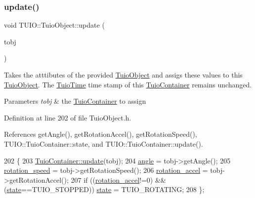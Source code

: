 \subsubsection{\texorpdfstring{update()}{update()}\hspace{0.1cm}{\footnotesize\ttfamily [4/4]}}
{\footnotesize\ttfamily void T\+U\+I\+O\+::\+Tuio\+Object\+::update (\begin{DoxyParamCaption}\item[{\hyperlink{class_t_u_i_o_1_1_tuio_object}{Tuio\+Object} $\ast$}]{tobj }\end{DoxyParamCaption})\hspace{0.3cm}{\ttfamily [inline]}}

Takes the atttibutes of the provided \hyperlink{class_t_u_i_o_1_1_tuio_object}{Tuio\+Object} and assigs these values to this \hyperlink{class_t_u_i_o_1_1_tuio_object}{Tuio\+Object}. The \hyperlink{class_t_u_i_o_1_1_tuio_time}{Tuio\+Time} time stamp of this \hyperlink{class_t_u_i_o_1_1_tuio_container}{Tuio\+Container} remains unchanged.


\begin{DoxyParams}{Parameters}
{\em tobj} & the \hyperlink{class_t_u_i_o_1_1_tuio_container}{Tuio\+Container} to assign \\
\hline
\end{DoxyParams}


Definition at line 202 of file Tuio\+Object.\+h.



References get\+Angle(), get\+Rotation\+Accel(), get\+Rotation\+Speed(), T\+U\+I\+O\+::\+Tuio\+Container\+::state, and T\+U\+I\+O\+::\+Tuio\+Container\+::update().


\begin{DoxyCode}
202                                        \{
203             \hyperlink{class_t_u_i_o_1_1_tuio_container_a20d5b3bd52eb41a58c313cc8ceda68c0}{TuioContainer::update}(tobj);
204             \hyperlink{class_t_u_i_o_1_1_tuio_object_a1c5652a3ee1175156f13777f0d8068ee}{angle} = tobj->getAngle();
205             \hyperlink{class_t_u_i_o_1_1_tuio_object_aee8d80d314a66646b834b2d74e0073d1}{rotation\_speed} = tobj->getRotationSpeed();
206             \hyperlink{class_t_u_i_o_1_1_tuio_object_a793a29a0bf9fd2f1becdb9d2d45fc463}{rotation\_accel} = tobj->getRotationAccel();
207             \textcolor{keywordflow}{if} ((\hyperlink{class_t_u_i_o_1_1_tuio_object_a793a29a0bf9fd2f1becdb9d2d45fc463}{rotation\_accel}!=0) && (\hyperlink{class_t_u_i_o_1_1_tuio_container_a61cfc66997d3d2f2a503e20bd29ddbf1}{state}==TUIO\_STOPPED)) 
      \hyperlink{class_t_u_i_o_1_1_tuio_container_a61cfc66997d3d2f2a503e20bd29ddbf1}{state} = TUIO\_ROTATING;
208         \};
\end{DoxyCode}



